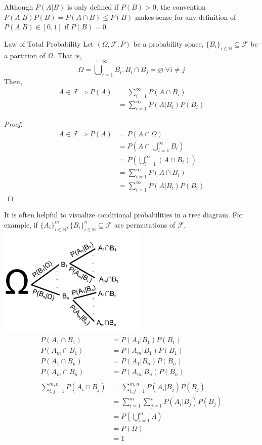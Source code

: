 \documentclass{article}
\begin{document}
	Although $P(A|B)$ is only defined if $P(B)>0$, the convention $P(A|B)P(B)=P(A\cap B)\leq P(B)$ makes sense for any definition of $P(A|B)\in[0, 1]$ if $P(B)=0$.
	\begin{mythm}{Law of Total Probability}{}
		Let $(\Omega, \mathcal{F}, P)$ be a probability space, $\{B_i\}_{i\in\mathbb{N}}\subseteq\mathcal{F}$ be a partition of $\Omega$. That is, $$\Omega=\dot\bigcup_{i=1}^{\infty}B_i, B_i\cap B_j=\varnothing\;\forall i\neq j$$
		Then,
		\begin{align*}
			A\in\mathcal{F}\Rightarrow P(A)&=\sum_{i=1}^{\infty}P(A\cap B_i)\\
			&=\sum_{i=1}^{\infty}P(A|B_i)P(B_i)
		\end{align*}
		\begin{proof}
			\begin{align*}
				A\in\mathcal{F}\Rightarrow P(A)&=P(A\cap\Omega)\\
				&=P(A\cap\bigcup_{i=1}^{\infty}B_i)\\
				&=P(\bigcup_{i=1}^{\infty}(A\cap B_i))\\
				&=\sum_{i=1}^{\infty}P(A\cap B_i)\\
				&=\sum_{i=1}^{\infty}P(A|B_i)P(B_i)
			\end{align*}
		\end{proof}
	\end{mythm}
	
	\begin{myrem}{}{}
		It is often helpful to visualize conditional probabilities in a tree diagram. For example, if $\{A_i\}_{i\in\mathbb{N}}^m, \{B_i\}_{i\in\mathbb{N}}^n\subseteq\mathcal{F}$ are permutations of $\mathcal{F}$,\\
		\includegraphics[width=200pt]{tree.png}
		\begin{align*}
			P(A_1\cap B_1)&=P(A_1|B_1)P(B_1)\\
			P(A_m\cap B_1)&=P(A_m|B_1)P(B_1)\\
			P(A_1\cap B_n)&=P(A_1|B_n)P(B_n)\\
			P(A_m\cap B_n)&=P(A_m|B_n)P(B_n)\\\\
			\sum_{i, j=1}^{m, n}P(A_i\cap B_j)&=\sum_{i, j=1}^{m, n}P(A_i|B_j)P(B_j)\\
			&=\sum_{i=1}^m\sum_{j=1}^nP(A_i|B_j)P(B_j)\\
			&=P(\bigcup_{i=1}^mA)\\
			&=P(\Omega)\\
			&=1
		\end{align*}
	\end{myrem}
	
\end{document}
